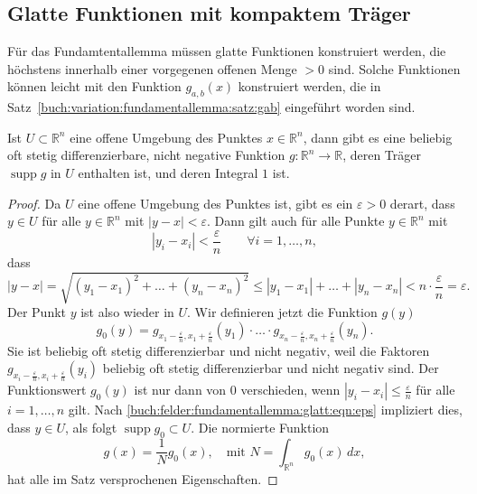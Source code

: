 %
%
%

%
%
\subsection{Glatte Funktionen mit kompaktem Träger}
Für das Fundamtentallemma müssen glatte Funktionen konstruiert werden, die
höchstens innerhalb einer vorgegenen offenen Menge $>0$ sind.
Solche Funktionen können leicht mit den Funktion $g_{a,b}(x)$
konstruiert werden, die in Satz~\ref{buch:variation:fundamentallemma:satz:gab}
eingeführt worden sind.

\begin{satz}
\label{buch:felder:fundamentallemma:glatt:satz:glatt}
Ist $U\subset \mathbb{R}^n$ eine offene Umgebung des Punktes
$x\in\mathbb{R}^n$, dann gibt es eine beliebig oft stetig
differenzierbare, nicht negative Funktion $g\colon \mathbb{R}^n\to\mathbb{R}$,
deren Träger $\operatorname{supp}g$ in $U$ enthalten ist,
und deren Integral $1$ ist.
\end{satz}

\begin{proof}
Da $U$ eine offene Umgebung des Punktes ist, gibt es ein $\varepsilon>0$
derart, dass $y\in U$ für alle $y\in\mathbb{R}^n$ mit $|y-x|<\varepsilon$.
Dann gilt auch für alle Punkte $y\in\mathbb{R}^n$ mit
\[
|y_i-x_i|< \frac{\varepsilon}{n}
\qquad
\forall i=1,\dots,n,
\]
dass 
\begin{equation}
|y-x|
=
\sqrt{
(y_1-x_1)^2
+
\dots
+
(y_n-x_n)^2
}
\le
|y_1-x_1|+\dots+|y_n-x_n|
<
n\cdot \frac{\varepsilon}n
=
\varepsilon.
\label{buch:felder:fundamentallemma:glatt:eqn:eps}
\end{equation}
Der Punkt $y$ ist also wieder in $U$.
Wir definieren jetzt die Funktion $g(y)$ 
\[
g_0(y)
=
g_{x_1-\frac{\varepsilon}n,x_1+\frac{\varepsilon}n}(y_1)
\cdot
\ldots
\cdot
g_{x_n-\frac{\varepsilon}n,x_n+\frac{\varepsilon}n}(y_n).
\]
Sie ist beliebig oft stetig differenzierbar und nicht negativ,
weil die Faktoren $g_{x_i-\frac{\varepsilon}n,x_i+\frac{\varepsilon}n}(y_i)$
beliebig oft stetig differenzierbar und nicht negativ sind.
Der Funktionswert $g_0(y)$ ist nur dann von $0$ verschieden, wenn
$|y_i-x_i|\le \frac{\varepsilon}n$ für alle $i=1,\dots,n$ gilt.
Nach
\eqref{buch:felder:fundamentallemma:glatt:eqn:eps}
impliziert dies, dass $y\in U$, als folgt
$\operatorname{supp}g_0\subset U$.
Die normierte Funktion
\[
g(x) = \frac{1}{N}g_0(x),\quad\text{mit }
N=\int_{\mathbb{R}^n} g_0(x)\,dx,
\]
hat alle im Satz versprochenen Eigenschaften.
\end{proof}





